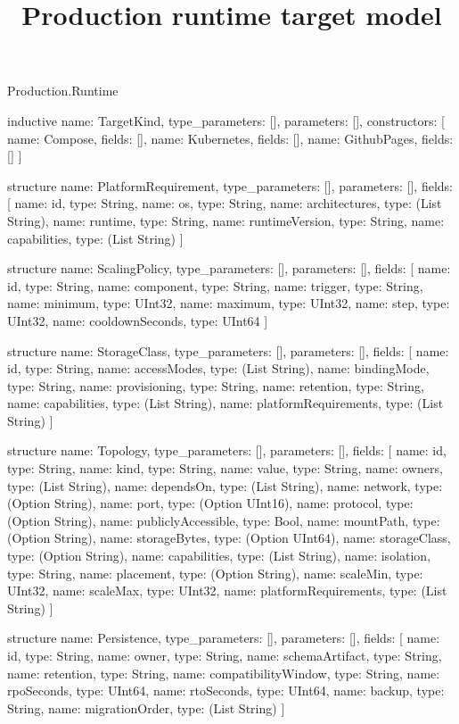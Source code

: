 \begin{lexlean}{Production.Runtime}
\title{Production runtime target model}
\begin{semanticmodule}
inductive{
  name: TargetKind,
  type_parameters: [],
  parameters: [],
  constructors: [
    {name: Compose, fields: []},
    {name: Kubernetes, fields: []},
    {name: GithubPages, fields: []}
  ]
}

structure{
  name: PlatformRequirement,
  type_parameters: [],
  parameters: [],
  fields: [
    {name: id, type: String},
    {name: os, type: String},
    {name: architectures, type: (List String)},
    {name: runtime, type: String},
    {name: runtimeVersion, type: String},
    {name: capabilities, type: (List String)}
  ]
}

structure{
  name: ScalingPolicy,
  type_parameters: [],
  parameters: [],
  fields: [
    {name: id, type: String},
    {name: component, type: String},
    {name: trigger, type: String},
    {name: minimum, type: UInt32},
    {name: maximum, type: UInt32},
    {name: step, type: UInt32},
    {name: cooldownSeconds, type: UInt64}
  ]
}

structure{
  name: StorageClass,
  type_parameters: [],
  parameters: [],
  fields: [
    {name: id, type: String},
    {name: accessModes, type: (List String)},
    {name: bindingMode, type: String},
    {name: provisioning, type: String},
    {name: retention, type: String},
    {name: capabilities, type: (List String)},
    {name: platformRequirements, type: (List String)}
  ]
}

structure{
  name: Topology,
  type_parameters: [],
  parameters: [],
  fields: [
    {name: id, type: String},
    {name: kind, type: String},
    {name: value, type: String},
    {name: owners, type: (List String)},
    {name: dependsOn, type: (List String)},
    {name: network, type: (Option String)},
    {name: port, type: (Option UInt16)},
    {name: protocol, type: (Option String)},
    {name: publiclyAccessible, type: Bool},
    {name: mountPath, type: (Option String)},
    {name: storageBytes, type: (Option UInt64)},
    {name: storageClass, type: (Option String)},
    {name: capabilities, type: (List String)},
    {name: isolation, type: String},
    {name: placement, type: (Option String)},
    {name: scaleMin, type: UInt32},
    {name: scaleMax, type: UInt32},
    {name: platformRequirements, type: (List String)}
  ]
}

structure{
  name: Persistence,
  type_parameters: [],
  parameters: [],
  fields: [
    {name: id, type: String},
    {name: owner, type: String},
    {name: schemaArtifact, type: String},
    {name: retention, type: String},
    {name: compatibilityWindow, type: String},
    {name: rpoSeconds, type: UInt64},
    {name: rtoSeconds, type: UInt64},
    {name: backup, type: String},
    {name: migrationOrder, type: (List String)}
  ]
}


\end{semanticmodule}
\end{lexlean}
